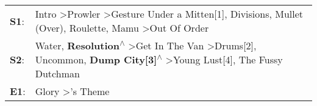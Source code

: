 \begin{supertabular}{p{0.03\textwidth}p{0.92\textwidth}}
 \textbf{S1}:  &                                         Intro\textsuperscript{} \textgreater \enspace Prowler\textsuperscript{} \textgreater \enspace Gesture Under a Mitten[1]\textsuperscript{}, \enspace Divisions\textsuperscript{}, \enspace Mullet (Over)\textsuperscript{}, \enspace Roulette\textsuperscript{}, \enspace Mamu\textsuperscript{} \textgreater \enspace Out Of Order\textsuperscript{}  \enspace  \\
 \textbf{S2}:  &  Water\textsuperscript{}, \enspace \textbf{Resolution\textsuperscript{$\wedge$}} \textgreater \enspace Get In The Van\textsuperscript{} \textgreater \enspace Drums[2]\textsuperscript{}, \enspace Uncommon\textsuperscript{}, \enspace \textbf{Dump City[3]\textsuperscript{$\wedge$}} \textgreater \enspace Young Lust[4]\textsuperscript{}, \enspace The Fussy Dutchman\textsuperscript{}  \enspace  \\
 \textbf{E1}:  &                                                                                                                                                                                                                                                                                                                   Glory\textsuperscript{} \textgreater {}'s Theme\textsuperscript{}  \enspace  \\
\end{supertabular}
